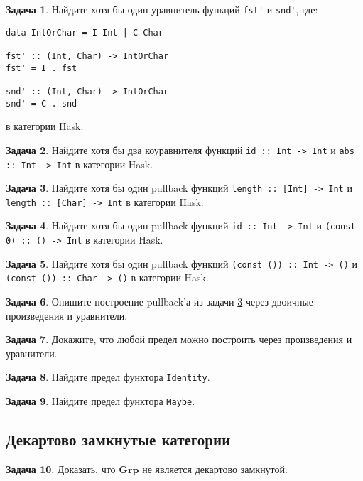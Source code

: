 \documentclass[10pt]{article}
\theoremstyle{definition}
\newtheorem{Pm}{Задача}[subsection]
\begin{document}
\begin{Pm}
    Найдите хотя бы один уравнитель функций \verb|fst'| и \verb|snd'|, где:
    \begin{verbatim}
data IntOrChar = I Int | C Char

fst' :: (Int, Char) -> IntOrChar
fst' = I . fst

snd' :: (Int, Char) -> IntOrChar
snd' = C . snd
    \end{verbatim}

    в категории Hask.
\end{Pm}

\begin{Pm}
    Найдите хотя бы два коуравнителя функций \verb|id :: Int -> Int| и \verb|abs :: Int -> Int| в категории Hask.
\end{Pm}

\begin{Pm}
    Найдите хотя бы один pullback функций \verb|length :: [Int] -> Int| и \verb|length :: [Char] -> Int| в категории Hask.
    \label{pullback1}
\end{Pm}

\begin{Pm}
    Найдите хотя бы один pullback функций \verb|id :: Int -> Int| и \verb|(const 0) :: () -> Int| в категории Hask.
\end{Pm}

\begin{Pm}
    Найдите хотя бы один pullback функций \verb|(const ()) :: Int -> ()| и \verb|(const ()) :: Char -> ()| в категории Hask.
\end{Pm}

\begin{Pm}
    Опишите построение pullback'а из задачи \ref{pullback1} через двоичные произведения и уравнители.
\end{Pm}

\begin{Pm}
    Докажите, что любой предел можно построить через произведения и уравнители.
\end{Pm}

\begin{Pm}
    Найдите предел функтора \verb|Identity|.
\end{Pm}

\begin{Pm}
    Найдите предел функтора \verb|Maybe|.
\end{Pm}

\subsection{Декартово замкнутые категории}
\begin{Pm}
    Доказать, что $\mathbf{Grp}$ не является декартово замкнутой.
\end{Pm}
\end{document}
